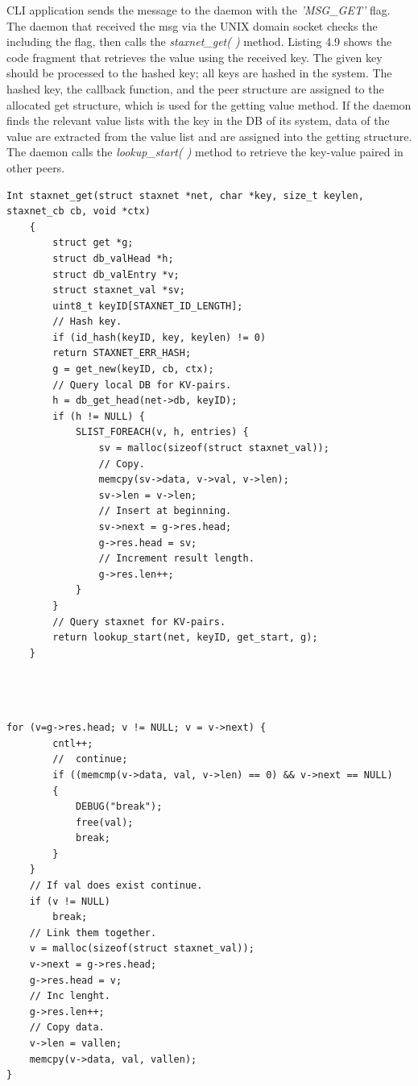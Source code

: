 CLI application sends the message to the daemon with the \textit{'MSG\_GET'} flag. The daemon that received the msg via the UNIX domain socket checks the including the flag, then calls the \textit{staxnet\_get( )} method. Listing 4.9 shows the code fragment that retrieves the value using the received key. The given key should be processed to the hashed key; all keys are hashed in the system. The hashed key, the callback function, and the peer structure are assigned to the allocated get structure, which is used for the getting value method. If the daemon finds the relevant value lists with the key in the DB of its system, data of the value are extracted from the value list and are assigned into the getting structure. The daemon calls the \textit{lookup\_start( )} method to retrieve the key-value paired in other peers.

\lstset{language=C} 
\begin{lstlisting}[caption=The procedure to get the value]
	Int staxnet_get(struct staxnet *net, char *key, size_t keylen, staxnet_cb cb, void *ctx)
	{
		struct get *g;
		struct db_valHead *h;
		struct db_valEntry *v;
		struct staxnet_val *sv;
		uint8_t keyID[STAXNET_ID_LENGTH];
		// Hash key.
		if (id_hash(keyID, key, keylen) != 0)
		return STAXNET_ERR_HASH;
		g = get_new(keyID, cb, ctx);
		// Query local DB for KV-pairs.
		h = db_get_head(net->db, keyID);
		if (h != NULL) {
			SLIST_FOREACH(v, h, entries) {
				sv = malloc(sizeof(struct staxnet_val));
				// Copy.
				memcpy(sv->data, v->val, v->len);
				sv->len = v->len;
				// Insert at beginning.
				sv->next = g->res.head;
				g->res.head = sv;
				// Increment result length.
				g->res.len++;
			}
		}
		// Query staxnet for KV-pairs.
		return lookup_start(net, keyID, get_start, g);
	}
	
	
	
\end{lstlisting}

\lstset{language=C} 
\begin{lstlisting}[caption=The method of compare values]
for (v=g->res.head; v != NULL; v = v->next) {
		cntl++;
		//  continue;
		if ((memcmp(v->data, val, v->len) == 0) && v->next == NULL)
		{
			DEBUG("break");
			free(val);
			break;
		}
	}
	// If val does exist continue.
	if (v != NULL)
		break;
	// Link them together.
	v = malloc(sizeof(struct staxnet_val));
	v->next = g->res.head;
	g->res.head = v;
	// Inc lenght.
	g->res.len++; 
	// Copy data.
	v->len = vallen;
	memcpy(v->data, val, vallen);
}
	
\end{lstlisting}

